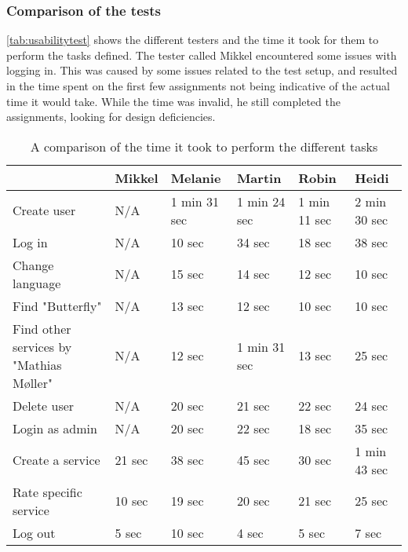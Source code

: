 \subsubsection{Comparison of the tests}
\autoref{tab:usabilitytest} shows the different testers and the time it took for them to perform the tasks defined.
The tester called Mikkel encountered some issues with logging in.
This was caused by some issues related to the test setup, and resulted in the time spent on the first few assignments not being indicative of the actual time it would take.
While the time was invalid, he still completed the assignments, looking for design deficiencies.
\begin{table}[]
    \begin{tabular}{|p{}|l|l|l|l|l|}
    \hline
                                            & Mikkel     & Melanie      & Martin           & Robin                  & Heidi               \\ \hline
    Create user                             & N/A        & 1 min 31 sec & 1 min 24 sec     & 1 min 11 sec    & 2 min 30 sec \\ \hline
    Log in                                  & N/A        & 10 sec       & 34 sec       & 18 sec             & 38 sec \\ \hline
    Change language                         & N/A        & 15 sec       & 14 sec       & 12 sec             & 10 sec \\ \hline
    Find "Butterfly"                        & N/A        & 13 sec       & 12 sec       & 10 sec             & 10 sec \\ \hline
    Find other services by "Mathias Møller" & N/A        & 12 sec       & 1 min 31 sec & 13 sec             & 25 sec \\ \hline
    Delete user                             & N/A        & 20 sec       & 21 sec       & 22 sec             & 24 sec \\ \hline
    Login as admin                          & N/A        & 20 sec       & 22 sec       & 18 sec             & 35 sec\\ \hline
    Create a service                        & 21 sec     & 38 sec       & 45 sec       & 30 sec             & 1 min 43 sec \\ \hline
    Rate specific service                   & 10 sec     & 19 sec       & 20 sec       & 21 sec             & 25 sec \\ \hline
    Log out                                 & 5 sec      & 10 sec       & 4 sec        & 5 sec              & 7 sec \\ \hline
    \end{tabular}
    \caption{A comparison of the time it took to perform the different tasks}
    \label{tab:usabilitytest}
\end{table}
